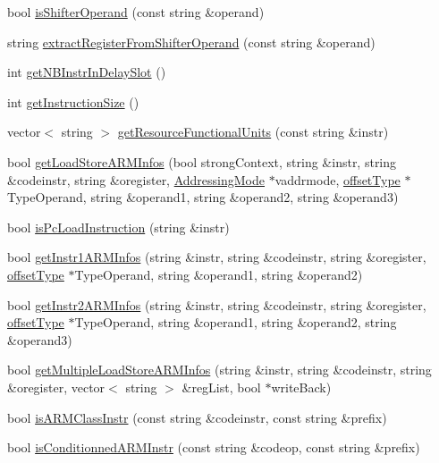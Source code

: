 \begin{DoxyCompactItemize}
\item 
bool \hyperlink{classARM_a1dae5cec5d67a1ebb5cfaf4c0c5a0936}{is\+Shifter\+Operand} (const string \&operand)
\item 
string \hyperlink{classARM_a12e96058317496e995642601bd65fb12}{extract\+Register\+From\+Shifter\+Operand} (const string \&operand)
\item 
int \hyperlink{classARM_a3df5e5b89546f7dfa9e50dc9f8c3518b}{get\+N\+B\+Instr\+In\+Delay\+Slot} ()
\item 
int \hyperlink{classARM_a1eb1efd95035b2a16f65bb1f58916e7b}{get\+Instruction\+Size} ()
\item 
vector$<$ string $>$ \hyperlink{classARM_a1fa177cc34bbe368167488311b7ab5e5}{get\+Resource\+Functional\+Units} (const string \&instr)
\item 
bool \hyperlink{classARM_acb46d6be8fd6799ed147be2b86991897}{get\+Load\+Store\+A\+R\+M\+Infos} (bool strong\+Context, string \&instr, string \&codeinstr, string \&oregister, \hyperlink{arch_8h_aa5cfff0cd9c5ad5ebda7aeecc4a50c2b}{Addressing\+Mode} $\ast$vaddrmode, \hyperlink{arch_8h_a63b66e201ffc27bbc8f89c8808382044}{offset\+Type} $\ast$Type\+Operand, string \&operand1, string \&operand2, string \&operand3)
\item 
bool \hyperlink{classARM_a765b29f0b8e3226723000d2f8d68ec8e}{is\+Pc\+Load\+Instruction} (string \&instr)
\item 
bool \hyperlink{classARM_a4434e1ab868a4d3a26940aaec3366dd0}{get\+Instr1\+A\+R\+M\+Infos} (string \&instr, string \&codeinstr, string \&oregister, \hyperlink{arch_8h_a63b66e201ffc27bbc8f89c8808382044}{offset\+Type} $\ast$Type\+Operand, string \&operand1, string \&operand2)
\item 
bool \hyperlink{classARM_a4a8d73d140cf70b7fb73d0359d9c52d0}{get\+Instr2\+A\+R\+M\+Infos} (string \&instr, string \&codeinstr, string \&oregister, \hyperlink{arch_8h_a63b66e201ffc27bbc8f89c8808382044}{offset\+Type} $\ast$Type\+Operand, string \&operand1, string \&operand2, string \&operand3)
\item 
bool \hyperlink{classARM_a8dc99512e617606f2fb5386b59a8ae47}{get\+Multiple\+Load\+Store\+A\+R\+M\+Infos} (string \&instr, string \&codeinstr, string \&oregister, vector$<$ string $>$ \&reg\+List, bool $\ast$write\+Back)
\item 
bool \hyperlink{classARM_a76b4f8a8fe1fb702277f5a4f2b9475d2}{is\+A\+R\+M\+Class\+Instr} (const string \&codeinstr, const string \&prefix)
\item 
bool \hyperlink{classARM_a9ef2e856b711bdb39806ebb3d59c4ee3}{is\+Conditionned\+A\+R\+M\+Instr} (const string \&codeop, const string \&prefix)

\end{DoxyCompactItemize}
